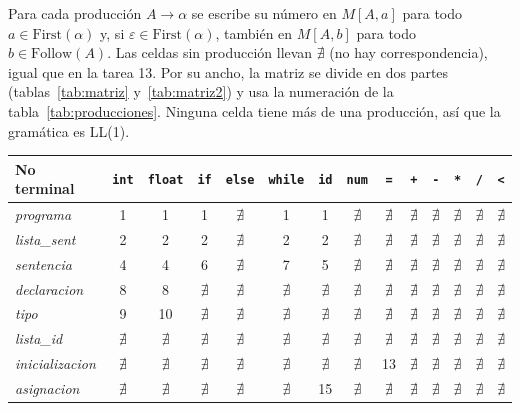 \documentclass[12pt]{article}
\newcommand{\nt}[1]{\textit{#1}}
\begin{document}
Para cada producción $A \rightarrow \alpha$ se escribe su número en $M[A, a]$ para todo
$a \in \text{First}(\alpha)$ y, si $\varepsilon \in \text{First}(\alpha)$, también en
$M[A, b]$ para todo $b \in \text{Follow}(A)$. Las celdas sin producción llevan $\nexists$ (no
hay correspondencia), igual que en la tarea 13. Por su ancho, la matriz se divide en dos partes (tablas~\ref{tab:matriz} y~\ref{tab:matriz2}) y usa la numeración de la tabla~\ref{tab:producciones}. Ninguna celda tiene más de una producción, así que la gramática
es LL(1).

\begin{table}[p]
\centering\footnotesize
\setlength{\tabcolsep}{5pt}
\renewcommand{\arraystretch}{1.08}
\begin{tabular}{@{}l*{13}{c}@{}}
\toprule
\textbf{No terminal} & \textbf{\texttt{int}} & \textbf{\texttt{float}} & \textbf{\texttt{if}} & \textbf{\texttt{else}} & \textbf{\texttt{while}} & \textbf{\texttt{id}} & \textbf{\texttt{num}} & \textbf{\texttt{=}} & \textbf{\texttt{+}} & \textbf{\texttt{-}} & \textbf{\texttt{*}} & \textbf{\texttt{/}} & \textbf{\texttt{<}} \\
\midrule
\nt{programa} & 1 & 1 & 1 & $\nexists$ & 1 & 1 & $\nexists$ & $\nexists$ & $\nexists$ & $\nexists$ & $\nexists$ & $\nexists$ & $\nexists$ \\
\nt{lista\_sent} & 2 & 2 & 2 & $\nexists$ & 2 & 2 & $\nexists$ & $\nexists$ & $\nexists$ & $\nexists$ & $\nexists$ & $\nexists$ & $\nexists$ \\
\nt{sentencia} & 4 & 4 & 6 & $\nexists$ & 7 & 5 & $\nexists$ & $\nexists$ & $\nexists$ & $\nexists$ & $\nexists$ & $\nexists$ & $\nexists$ \\
\nt{declaracion} & 8 & 8 & $\nexists$ & $\nexists$ & $\nexists$ & $\nexists$ & $\nexists$ & $\nexists$ & $\nexists$ & $\nexists$ & $\nexists$ & $\nexists$ & $\nexists$ \\
\nt{tipo} & 9 & 10 & $\nexists$ & $\nexists$ & $\nexists$ & $\nexists$ & $\nexists$ & $\nexists$ & $\nexists$ & $\nexists$ & $\nexists$ & $\nexists$ & $\nexists$ \\
\nt{lista\_id} & $\nexists$ & $\nexists$ & $\nexists$ & $\nexists$ & $\nexists$ & $\nexists$ & $\nexists$ & $\nexists$ & $\nexists$ & $\nexists$ & $\nexists$ & $\nexists$ & $\nexists$ \\
\nt{inicializacion} & $\nexists$ & $\nexists$ & $\nexists$ & $\nexists$ & $\nexists$ & $\nexists$ & $\nexists$ & 13 & $\nexists$ & $\nexists$ & $\nexists$ & $\nexists$ & $\nexists$ \\
\nt{asignacion} & $\nexists$ & $\nexists$ & $\nexists$ & $\nexists$ & $\nexists$ & 15 & $\nexists$ & $\nexists$ & $\nexists$ & $\nexists$ & $\nexists$ & $\nexists$ & $\nexists$ \\

\end{tabular}
\end{table}
\end{document}
